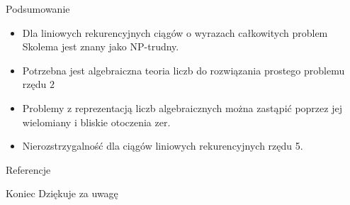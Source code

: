 \documentclass[handout]{beamer}
\theoremstyle{definition}
\theoremstyle{named}
\begin{document}
\begin{frame}{Podsumowanie}
    \begin{itemize}
        \item  Dla liniowych rekurencyjnych ciągów o wyrazach całkowitych problem Skolema jest znany jako NP-trudny. \cite{BLONDEL200291}
        \item Potrzebna jest algebraiczna teoria liczb do rozwiązania prostego problemu rzędu $2$ \cite{filip}
        \pause
        \item Problemy z reprezentacją liczb algebraicznych można zastąpić poprzez jej wielomiany i bliskie otoczenia zer. \cite{ouaknine2017ultimate}
        \item Nierozstrzygalność dla ciągów liniowych rekurencyjnych rzędu 5.
    \end{itemize}
\end{frame}

\begin{frame}{Referencje}
    
    
\end{frame}

\begin{frame}{Koniec}
    Dziękuje za uwagę
\end{frame}
\end{document}
